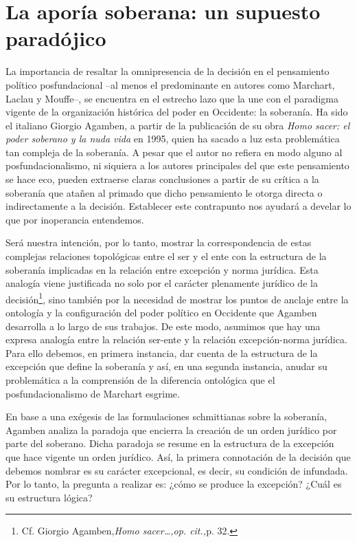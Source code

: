 \documentclass{book}
\begin{document}
\section{La aporía soberana: un supuesto paradójico}

La importancia de resaltar la omnipresencia de la decisión en el
pensamiento político posfundacional --al menos el predominante en
autores como Marchart, Laclau y Mouffe--, se encuentra en el estrecho
lazo que la une con el paradigma vigente de la organización histórica
del poder en Occidente: la soberanía. Ha sido el italiano Giorgio
Agamben, a partir de la publicación de su obra \emph{Homo sacer: el
poder soberano y la nuda vida} en 1995, quien ha sacado a luz esta
problemática tan compleja de la soberanía. A pesar que el autor no
refiera en modo alguno al posfundacionalismo, ni siquiera a los autores
principales del que este pensamiento se hace eco, pueden extraerse
claras conclusiones a partir de su crítica a la soberanía que atañen al
primado que dicho pensamiento le otorga directa o indirectamente a la
decisión. Establecer este contrapunto nos ayudará a develar lo que por
inoperancia entendemos.

Será nuestra intención, por lo tanto, mostrar la correspondencia de
estas complejas relaciones topológicas entre el ser y el ente con la
estructura de la soberanía implicadas en la relación entre excepción y
norma jurídica. Esta analogía viene justificada no solo por el carácter
plenamente jurídico de la decisión\footnote{Cf. Giorgio
  Agamben,\emph{Homo sacer\ldots,op. cit.,}p. 32.}, sino también por la
necesidad de mostrar los puntos de anclaje entre la ontología y la
configuración del poder político en Occidente que Agamben desarrolla a
lo largo de sus trabajos. De este modo, asumimos que hay una expresa
analogía entre la relación ser-ente y la relación excepción-norma
jurídica. Para ello debemos, en primera instancia, dar cuenta de la
estructura de la excepción que define la soberanía y así, en una segunda
instancia, anudar su problemática a la comprensión de la diferencia
ontológica que el posfundacionalismo de Marchart esgrime.

En base a una exégesis de las formulaciones schmittianas sobre la
soberanía, Agamben analiza la paradoja que encierra la creación de un
orden jurídico por parte del soberano. Dicha paradoja se resume en la
estructura de la excepción que hace vigente un orden jurídico. Así, la
primera connotación de la decisión que debemos nombrar es su carácter
excepcional, es decir, su condición de infundada. Por lo tanto, la
pregunta a realizar es: ¿cómo se produce la excepción? ¿Cuál es su
estructura lógica?
\end{document}
